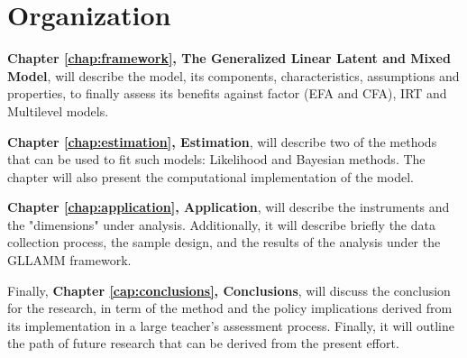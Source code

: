 \section{Organization}

\textbf{Chapter \ref{chap:framework}, The Generalized Linear Latent and Mixed Model}, will describe the model, its components, characteristics, assumptions and properties, to finally assess its benefits against factor (EFA and CFA), IRT and Multilevel models.

\textbf{Chapter \ref{chap:estimation}, Estimation}, will describe {\color{red} two} of the methods that can be used to fit such models: {\color{red} Likelihood and Bayesian methods}. The chapter will also present the computational implementation of the model.

\textbf{Chapter \ref{chap:application}, Application}, will describe the instruments and the "dimensions" under analysis. Additionally, it will describe briefly the data collection process, the sample design, and the results of the analysis under the GLLAMM framework.

Finally, \textbf{Chapter \ref{cap:conclusions}, Conclusions}, will discuss the conclusion for the research, in term of the method and the policy implications derived from its implementation in a large teacher's assessment process. Finally, it will outline the path of future research that can be derived from the present effort.
